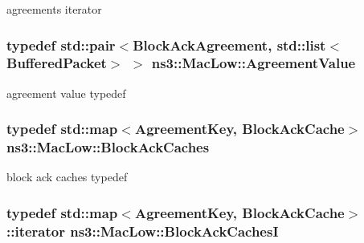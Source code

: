 agreements iterator 

\subsubsection[{\texorpdfstring{Agreement\+Value}{AgreementValue}}]{\setlength{\rightskip}{0pt plus 5cm}typedef std\+::pair$<${\bf Block\+Ack\+Agreement}, {\bf std\+::list}$<${\bf Buffered\+Packet}$>$ $>$ {\bf ns3\+::\+Mac\+Low\+::\+Agreement\+Value}\hspace{0.3cm}{\ttfamily [private]}}\hypertarget{classns3_1_1MacLow_a68fcd01fab733ead22d9655640258a6a}{}\label{classns3_1_1MacLow_a68fcd01fab733ead22d9655640258a6a}


agreement value typedef 

\subsubsection[{\texorpdfstring{Block\+Ack\+Caches}{BlockAckCaches}}]{\setlength{\rightskip}{0pt plus 5cm}typedef std\+::map$<${\bf Agreement\+Key}, {\bf Block\+Ack\+Cache}$>$ {\bf ns3\+::\+Mac\+Low\+::\+Block\+Ack\+Caches}\hspace{0.3cm}{\ttfamily [private]}}\hypertarget{classns3_1_1MacLow_a9e628f9b15e0fd3eaf7b5eeb586ea968}{}\label{classns3_1_1MacLow_a9e628f9b15e0fd3eaf7b5eeb586ea968}


block ack caches typedef 

\subsubsection[{\texorpdfstring{Block\+Ack\+CachesI}{BlockAckCachesI}}]{\setlength{\rightskip}{0pt plus 5cm}typedef std\+::map$<${\bf Agreement\+Key}, {\bf Block\+Ack\+Cache}$>$\+::iterator {\bf ns3\+::\+Mac\+Low\+::\+Block\+Ack\+CachesI}\hspace{0.3cm}{\ttfamily [private]}}\hypertarget{classns3_1_1MacLow_ae0b0abf84b6078031fabd4e85e1cb1bf}{}\label{classns3_1_1MacLow_ae0b0abf84b6078031fabd4e85e1cb1bf}


